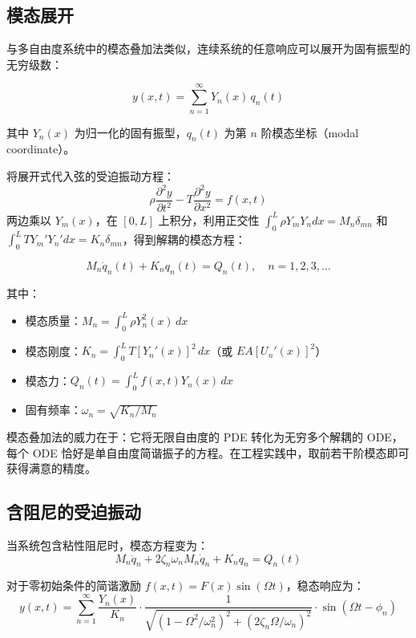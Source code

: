 \subsection{模态展开}

与多自由度系统中的模态叠加法类似，连续系统的任意响应可以展开为固有振型的无穷级数：

\begin{myformula}
\[
y(x,t) = \sum_{n=1}^{\infty} Y_n(x)\, q_n(t)
\]
\end{myformula}

其中 $Y_n(x)$ 为归一化的固有振型，$q_n(t)$ 为第 $n$ 阶模态坐标（modal coordinate）。

将展开式代入弦的受迫振动方程：
\[
\rho\frac{\partial^2 y}{\partial t^2} - T\frac{\partial^2 y}{\partial x^2} = f(x,t)
\]
两边乘以 $Y_m(x)$，在 $[0,L]$ 上积分，利用正交性 $\int_0^L \rho Y_m Y_n dx = M_n\delta_{mn}$ 和 $\int_0^L T Y_m' Y_n' dx = K_n\delta_{mn}$，得到解耦的模态方程：

\begin{myformula}
\[
M_n \ddot{q}_n(t) + K_n q_n(t) = Q_n(t), \quad n=1,2,3,\dots
\]
\end{myformula}

其中：
\begin{itemize}
    \item 模态质量：$M_n = \int_0^L \rho Y_n^2(x)\,dx$
    \item 模态刚度：$K_n = \int_0^L T [Y_n'(x)]^2\,dx$（或 $EA [U_n'(x)]^2$）
    \item 模态力：$Q_n(t) = \int_0^L f(x,t)Y_n(x)\,dx$
    \item 固有频率：$\omega_n = \sqrt{K_n/M_n}$
\end{itemize}

\begin{remark}
模态叠加法的威力在于：它将无限自由度的 PDE 转化为无穷多个解耦的 ODE，每个 ODE 恰好是单自由度简谐振子的方程。在工程实践中，取前若干阶模态即可获得满意的精度。
\end{remark}

\subsection{含阻尼的受迫振动}

当系统包含粘性阻尼时，模态方程变为：
\[
M_n \ddot{q}_n + 2\zeta_n\omega_n M_n \dot{q}_n + K_n q_n = Q_n(t)
\]

对于零初始条件的简谐激励 $f(x,t)=F(x)\sin(\Omega t)$，稳态响应为：
\[
y(x,t) = \sum_{n=1}^{\infty} \frac{Y_n(x)}{K_n} \cdot \frac{1}{\sqrt{(1-\Omega^2/\omega_n^2)^2 + (2\zeta_n\Omega/\omega_n)^2}} \cdot \sin(\Omega t - \phi_n)
\]

